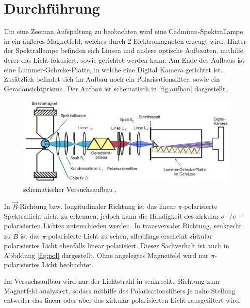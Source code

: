 \section{Durchführung}
\label{sec:durch}
Um eine Zeeman Aufspaltung zu beobachten wird eine Cadmium-Spektrallampe in ein äußeres Magnetfeld, welches durch 2 Elektromagneten erzeugt wird. Hinter der Spektrallampe befinden 
sich Linsen und andere optische Aufbauten, mithilfe derer das Licht fokusiert, sowie gerichtet werden kann. Am Ende des Aufbaus ist eine Lummer-Gehrcke-Platte, in welche eine 
Digital Kamera gerichtet ist. Zusätzlich befindet sich im Aufbau noch ein Polarisationsfilter, sowie ein Geradansichtprisma. Der Aufbau ist schematisch in \autoref{fig:aufbau} dargestellt.

\vspace{-5pt}
\begin{figure}[H]
    \centering
    \includegraphics[scale=0.3]{aufbau.png}
    \caption{schematischer Versuchsaufbau \cite{V27}.}
    \label{fig:aufbau}
\end{figure}

\noindent
In $\vec{B}$-Richtung bzw. longitudinaler Richtung ist das linear $\pi$-polarisierte Spektrallicht
nicht zu erkennen, jedoch kann die Händigkeit des zirkular $\sigma^{+}$/$\sigma^{-}$-polarisierten Lichtes
unterschieden werden. In transversaler Richtung, senkrecht zu $\vec{B}$ ist das $\pi$-polarisierte Licht
zu sehen, allerdings erscheint zirkular polarisiertes Licht ebenfalls linear polarisiert.
Dieser Sachverhalt ist auch in Abbildung \ref{fig:pol} dargestellt. Ohne angelegtes Magnetfeld
wird nur $\pi$-polarisiertes Licht beobachtet. 

\noindent
Im Versuchsaufbau wird nur der Lichtstrahl in senkrechte Richtung zum Magnetfeld analysiert, sodass mithilfe des Polarisationsfilters je nahc Stellung entweder das linear oder
aber das zirkular polarisierten Licht rausgefiltert wird.

